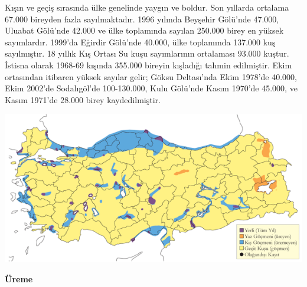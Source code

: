 \documentclass[
  letterpaper,
  DIV=11,
  numbers=noendperiod]{scrreprt}
\begin{document}
Kışın ve geçiş sırasında ülke genelinde yaygın ve boldur. Son yıllarda
ortalama 67.000 bireyden fazla sayılmaktadır. 1996 yılında Beyşehir
Gölü'nde 47.000, Uluabat Gölü'nde 42.000 ve ülke toplamında sayılan
250.000 birey en yüksek sayımlardır. 1999'da Eğirdir Gölü'nde 40.000,
ülke toplamında 137.000 kuş sayılmıştır. 18 yıllık Kış Ortası Su kuşu
sayımlarının ortalaması 93.000 kuştur. İstisna olarak 1968-69 kışında
355.000 bireyin kışladığı tahmin edilmiştir. Ekim ortasından itibaren
yüksek sayılar gelir; Göksu Deltası'nda Ekim 1978'de 40.000, Ekim
2002'de Sodalıgöl'de 100-130.000, Kulu Gölü'nde Kasım 1970'de 45.000, ve
Kasım 1971'de 28.000 birey kaydedilmiştir.

\includegraphics{images/harita_Page_023.png}

\textbf{Üreme}
\end{document}
